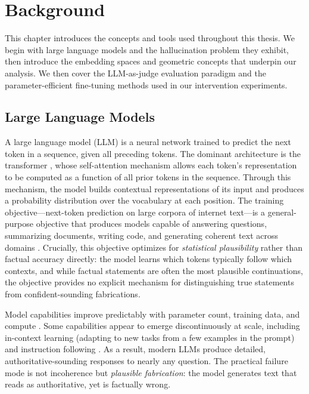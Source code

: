 
\chapter{Background}
\label{ch:background}

This chapter introduces the concepts and tools used throughout this thesis. We begin with large language models and the hallucination problem they exhibit, then introduce the embedding spaces and geometric concepts that underpin our analysis. We then cover the LLM-as-judge evaluation paradigm and the parameter-efficient fine-tuning methods used in our intervention experiments.

\section{Large Language Models}
\label{sec:bg-llms}

A large language model (LLM) is a neural network trained to predict the next token in a sequence, given all preceding tokens. The dominant architecture is the transformer \citep{vaswani2017attention}, whose self-attention mechanism allows each token's representation to be computed as a function of all prior tokens in the sequence. Through this mechanism, the model builds contextual representations of its input and produces a probability distribution over the vocabulary at each position. The training objective---next-token prediction on large corpora of internet text---is a general-purpose objective that produces models capable of answering questions, summarizing documents, writing code, and generating coherent text across domains \citep{brown2020language}. Crucially, this objective optimizes for \emph{statistical plausibility} rather than factual accuracy directly: the model learns which tokens typically follow which contexts, and while factual statements are often the most plausible continuations, the objective provides no explicit mechanism for distinguishing true statements from confident-sounding fabrications.

Model capabilities improve predictably with parameter count, training data, and compute \citep{kaplan2020scaling}. Some capabilities appear to emerge discontinuously at scale, including in-context learning (adapting to new tasks from a few examples in the prompt) and instruction following \citep{wei2022emergent}. As a result, modern LLMs produce detailed, authoritative-sounding responses to nearly any question. The practical failure mode is not incoherence but \emph{plausible fabrication}: the model generates text that reads as authoritative, yet is factually wrong.

